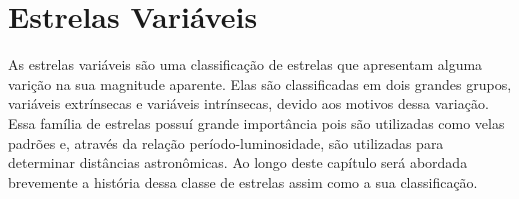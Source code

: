 \chapter{Estrelas Variáveis}
\label{cap:estrelas}

\nocite{Catelan_book}

As estrelas variáveis são uma classificação de estrelas que apresentam alguma varição na sua magnitude aparente. Elas são classificadas em dois grandes grupos, variáveis extrínsecas e variáveis intrínsecas,  devido aos motivos dessa variação. Essa família de estrelas possuí grande importância pois são utilizadas como velas padrões e, através da relação período-luminosidade, são utilizadas para determinar distâncias astronômicas. Ao longo deste capítulo será abordada brevemente a história dessa classe de estrelas assim como a sua classificação.


